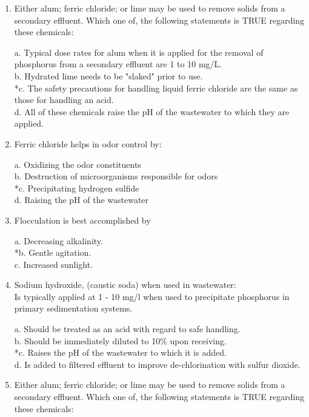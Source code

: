 \begin{enumerate}
\item Either alum; ferric chloride; or lime may be used to remove solids from a secondary effluent. Which one of, the following statements is TRUE regarding these chemicals: 

a. Typical dose rates for alum when it is applied for the removal of phosphorus from a secondary effluent are 1 to 10 mg/L. \\
b. Hydrated lime needs to be "slaked" prior to use. \\
*c. The safety precautions for handling liquid ferric chloride are the same as those for handling an acid. \\
d. All of these chemicals raise the pH of the wastewater to which they are applied. 

\item Ferric chloride helps in odor control by:

a. Oxidizing the odor constituents \\
b. Destruction of microorganisms responsible for odors \\
*c. Precipitating hydrogen sulfide \\
d. Raising the pH of the wastewater 


\item Flocculation is best accomplished by 

a. Decreasing alkalinity. \\
*b. Gentle agitation. \\
c. Increased sunlight. \\

\item  Sodium hydroxide, (caustic soda) when used in wastewater: \\
Is typically applied at 1 - 10 mg/l when used to precipitate phosphorus in primary sedimentation systems. 

a. Should be treated as an acid with regard to safe handling. \\
b. Should be immediately diluted to 10\% upon receiving. \\
*c. Raises the pH of the wastewater to which it is added. \\
d. Is added to filtered effluent to improve de-chlorination with sulfur dioxide. 

\item  Either alum; ferric chloride; or lime may be used to remove solids from a secondary effluent. Which one of, the following statements is TRUE regarding these chemicals: 


\end{enumerate}
